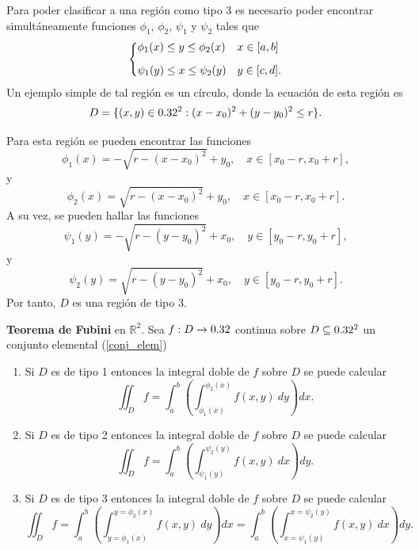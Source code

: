 \begin{example}
    Para poder clasificar a una regi\'on como tipo 3 es necesario poder encontrar simult\'aneamente funciones $\phi_1$, $\phi_2$, $\psi_1$ y $\psi_2$ tales que
    \[
    \begin{dcases}
        \phi_1(x)\leq y\leq\phi_2(x) & x\in[a,b]\\[.2cm]
        \psi_1(y)\leq x\leq\psi_2(y) & y\in[c,d].
    \end{dcases}
    \]
    Un ejemplo simple de tal regi\'on es un c\'irculo, donde la ecuaci\'on de esta regi\'on es $$D=\{(x,y)\in0.32^2:(x-x_0)^2+(y-y_0)^2\leq r\}.$$  

    

    Para esta regi\'on se pueden encontrar las funciones
    \[
        \phi_1(x)=-\sqrt{r-(x-x_0)^2}+y_0,\quad x\in[x_0-r,x_0+r],
    \]
    y
    \[
        \phi_2(x)=\sqrt{r-(x-x_0)^2}+y_0,\quad x\in[x_0-r,x_0+r].
    \]
    A su vez, se pueden hallar las funciones
    \[
        \psi_1(y)=-\sqrt{r-(y-y_0)^2}+x_0,\quad y\in[y_0-r,y_0+r],
    \]
    y
    \[
        \psi_2(y)=\sqrt{r-(y-y_0)^2}+x_0,\quad y\in[y_0-r,y_0+r].
    \]
    Por tanto, $D$ es una regi\'on de tipo 3.
\end{example}


\begin{theorem}  \label{col:fubini} \textbf{Teorema de Fubini} en $\mathbb{R}^{2}.$  Sea $f:D\to0.32$ continua sobre  $D\subseteq0.32^2$  un conjunto elemental   (\ref{conj_elem}) 
   
\begin{enumerate} 
        \item  Si $D$ es de tipo 1   entonces la integral doble de $f$ sobre $D$ se puede calcular
        \[
            \iint_D f=\int_a^b\left(\int_{\phi_1(x)}^{\phi_2(x)}f(x,y)\:dy\right)dx.  
        \]
       
        \item   Si $D$ es de tipo 2   entonces la integral doble de $f$ sobre $D$ se puede calcular
        \[
            \iint_D f=\int_a^b\left(\int_{\psi_1(y)}^{\psi_2(y)}f(x,y)\:dx\right)dy.  
        \]
       
        \item Si $D$ es de tipo 3   entonces la integral doble de $f$ sobre $D$ se puede calcular  
         \[
            \iint_D f=\int_a^b\left(\int_{y=\phi_1(x)}^{y=\phi_2(x)}f(x,y)\:dy\right)dx=\int_a^b\left(\int_{x=\psi_1(y)}^{x=\psi_2(y)}f(x,y)\:dx\right)dy. 
        \]
    \end{enumerate}
\end{theorem}


